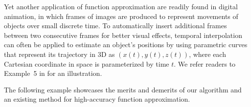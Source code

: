 \documentclass[review]{elsarticle}
\newcommand{\abstol}{\varepsilon}
\theoremstyle{definition}
\newcommand{\cosappx}{\widehat{\operatorname*{cos}}}
\newcommand{\sinappx}{\widehat{\operatorname*{sin}}}
\begin{document}
\begin{comment}
Denote $\sinappx(x)$ and $\cosappx (x)$ the approximate functions of $\sin(x)$ and
$\cos(x)$ on the interval $[0,4\pi]$, respectively; and let the resultant
approximants of $x(u,v)$, $y(u,v)$, and $z(u,v)$ be $\hat{x}(u,v)$,
$\hat{y}(u,v)$, and $\hat{z}(u,v)$, respectively.
Then we have
\begin{align*}
   \hat{x}(u,v) & =  \left[a\left(1-\frac{v}{2\pi}\right)\left(1+\cosappx(u)\right) + c\right]\cosappx(nv),
\\ \hat{y}(u,v) & = \left[a\left(1-\frac{v}{2\pi}\right)(1+\cosappx(u)) + c\right] \sinappx(nv),
\\ \hat{z}(u,v) & = \frac{bv}{2\pi} + a\left(1-\frac{v}{2\pi}\right)\sinappx(u).
\end{align*}
Define the \emph{overall} approximation error measure as the supremum norm
\begin{align*}
   \max\limits_{u,v \in [0, 2 \pi] } & \left\{   |x(u,v)-\hat{x}(u,v)|,\right.
   \left.  |y(u,v)-\hat{y}(u,v)|,
                                  \ \    |z(u,v)-\hat{z}(u,v)|\right\}.
\end{align*}
Even if we set the error tolerance $\abstol$ to be as big as $0.1$ for computing
$\sinappx$ and $\cosappx$, we can still obtain a much diminished overall error
in the order of $9 \times 10^{-4}$; see the error plot in
Figure~\ref{fig:funappxseashell}b). The reconstructed surface in
Figure~\ref{fig:funappxseashell}a) is very similar to the original seashell
image.
\end{exmp}
\end{comment}

Yet another application of function approximation are readily found in digital animation,
in which frames of images are produced to represent movements of
objects over small discrete time. To automatically insert additional frames between
two consecutive frames for better visual effects, temporal
interpolation can often be applied to estimate an object's positions by using
parametric curves that represent its trajectory in 3D as $(x(t), y(t), z(t))$,
where each Cartesian coordinate in space is parameterized by time $t$. We refer
readers to Example~5 in \cite[Chapter~3, Section~6]{Din15a} for an illustration.


The following example showcases the merits and demerits of our algorithm and an
existing method for high-accuracy function approximation.
\end{document}

